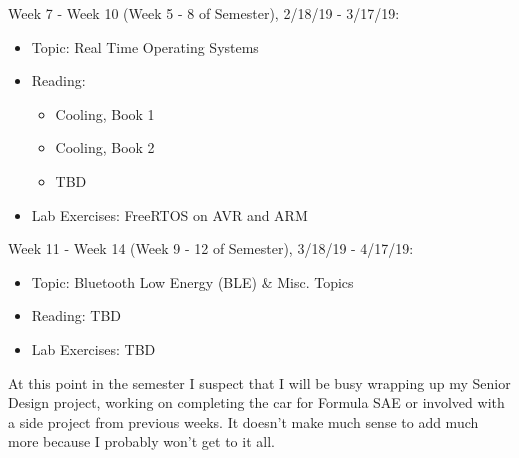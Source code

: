 \documentclass[12pt,a4paper,oneside,notitlepage]{article}
\begin{document}
Week 7 - Week 10 (Week 5 - 8 of Semester), 2/18/19 - 3/17/19:
\begin{itemize}
\item Topic: Real Time Operating Systems
\item Reading:
	\begin{itemize}
		\item Cooling, Book 1
		\item Cooling, Book 2
		\item TBD
	\end{itemize}
\item Lab Exercises: FreeRTOS on AVR and ARM
\end{itemize}

Week 11 - Week 14 (Week 9 - 12 of Semester), 3/18/19 - 4/17/19:
\begin{itemize}
\item Topic: Bluetooth Low Energy (BLE) \& Misc. Topics
\item Reading: TBD
\item Lab Exercises: TBD
\end{itemize}

At this point in the semester I suspect that I will be busy wrapping up my Senior Design project, working on completing the car for Formula SAE or involved with a side project from previous weeks. It doesn't make much sense to add much more because I probably won't get to it all.
\end{document}
